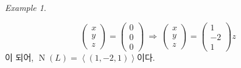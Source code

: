 \documentclass[unfonts,oneside,a4paper]{oblivoir}
\theoremstyle{definition}
\theoremstyle{theorem}
\theoremstyle{remark}
\theoremstyle{remark}
\theoremstyle{remark}
\newtheorem*{example}{Example}
\theoremstyle{remark}
\DeclareMathOperator{\Null}{N}
\begin{document}
\begin{example}
\begin{enumerate}
\begin{solution}
\begin{equation*}
\begin{pmatrix}
                    x \\ y \\ z
                    \end{pmatrix} = \begin{pmatrix}
                    0 \\ 0 \\ 0
                    \end{pmatrix} \ \Rightarrow \ \begin{pmatrix}
                    x \\ y \\ z
                    \end{pmatrix} = \begin{pmatrix}
                    1 \\ -2 \\ 1
                \end{pmatrix} z
            \end{equation*}
            이 되어, $\Null (L) = \left<(1, -2, 1)\right>$이다.
        \end{solution}


\end{enumerate}
\end{example}
\end{document}
